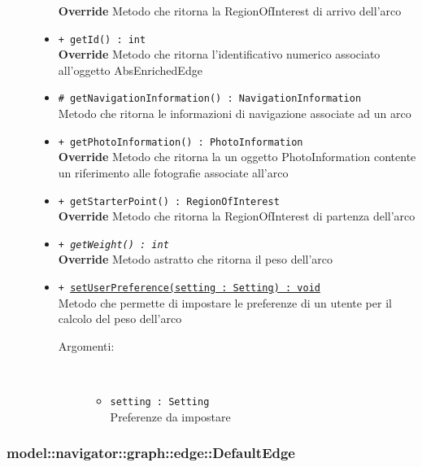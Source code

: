 \documentclass[../DefinizioneDiProdotto.tex]{subfiles}
\begin{document}
\begin{description}
\begin{itemize}
\textbf{Override} Metodo che ritorna la RegionOfInterest di arrivo dell'arco
 \item \texttt{+ getId() : int}\\
\textbf{Override} Metodo che ritorna l'identificativo numerico associato all'oggetto AbsEnrichedEdge
 \item \texttt{\# getNavigationInformation() : NavigationInformation}\\
Metodo che ritorna le informazioni di navigazione associate ad un arco
 \item \texttt{+ getPhotoInformation() : PhotoInformation}\\
\textbf{Override} Metodo che ritorna la un oggetto PhotoInformation contente un riferimento alle fotografie associate all'arco
 \item \texttt{+ getStarterPoint() : RegionOfInterest}\\
\textbf{Override} Metodo che ritorna la RegionOfInterest di partenza dell'arco
 \item \texttt{+ \textit{getWeight() : int}}\\
\textbf{Override} Metodo astratto che ritorna il peso dell'arco
 \item \texttt{+ \underline{setUserPreference(setting : Setting) : void}}\\
Metodo che permette di impostare le preferenze di un utente per il calcolo del peso dell'arco
 \begin{description}
\item[Argomenti:] \
\begin{itemize}
\item \texttt{setting : Setting}\\
Preferenze da impostare\end{itemize}
\end{description}
\end{itemize}
\end{description}

\subsubsection{model::navigator::graph::edge::DefaultEdge}
\end{document}
